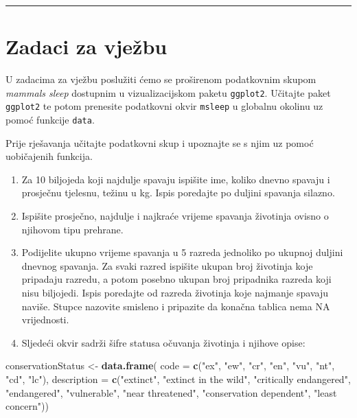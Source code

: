 \documentclass[]{book}
\newenvironment{Shaded}{\begin{snugshade}}{\end{snugshade}}
\newcommand{\KeywordTok}[1]{\textcolor[rgb]{0.13,0.29,0.53}{\textbf{#1}}}
\newcommand{\DataTypeTok}[1]{\textcolor[rgb]{0.13,0.29,0.53}{#1}}
\newcommand{\StringTok}[1]{\textcolor[rgb]{0.31,0.60,0.02}{#1}}
\newcommand{\NormalTok}[1]{#1}
\theoremstyle{definition}
\theoremstyle{definition}
\theoremstyle{definition}
\theoremstyle{remark}
\begin{document}
\begin{center}\rule{0.5\linewidth}{\linethickness}\end{center}

\section*{Zadaci za vježbu}\label{zadaci-za-vjezbu-9}

U zadacima za vježbu poslužiti ćemo se proširenom podatkovnim skupom
\emph{mammals sleep} dostupnim u vizualizacijskom paketu
\texttt{ggplot2}. Učitajte paket \texttt{ggplot2} te potom prenesite
podatkovni okvir \texttt{msleep} u globalnu okolinu uz pomoć funkcije
\texttt{data}.

Prije rješavanja učitajte podatkovni skup i upoznajte se s njim uz pomoć
uobičajenih funkcija.

\begin{enumerate}
\def\labelenumi{\arabic{enumi}.}
\item
  Za 10 biljojeda koji najdulje spavaju ispišite ime, koliko dnevno
  spavaju i prosječnu tjelesnu, težinu u kg. Ispis poredajte po duljini
  spavanja silazno.
\item
  Ispišite prosječno, najdulje i najkraće vrijeme spavanja životinja
  ovisno o njihovom tipu prehrane.
\item
  Podijelite ukupno vrijeme spavanja u 5 razreda jednoliko po ukupnoj
  duljini dnevnog spavanja. Za svaki razred ispišite ukupan broj
  životinja koje pripadaju razredu, a potom posebno ukupan broj
  pripadnika razreda koji nisu biljojedi. Ispis poredajte od razreda
  životinja koje najmanje spavaju naviše. Stupce nazovite smisleno i
  pripazite da konačna tablica nema NA vrijednosti.
\item
  Sljedeći okvir sadrži šifre statusa očuvanja životinja i njihove
  opise:
\end{enumerate}

\begin{Shaded}
\begin{Highlighting}[]
\NormalTok{conservationStatus <-}\StringTok{ }\KeywordTok{data.frame}\NormalTok{( }
  \DataTypeTok{code =} \KeywordTok{c}\NormalTok{(}\StringTok{"ex"}\NormalTok{, }\StringTok{"ew"}\NormalTok{, }\StringTok{"cr"}\NormalTok{, }\StringTok{"en"}\NormalTok{, }\StringTok{"vu"}\NormalTok{, }\StringTok{"nt"}\NormalTok{, }\StringTok{"cd"}\NormalTok{, }\StringTok{"lc"}\NormalTok{),}
  \DataTypeTok{description =} \KeywordTok{c}\NormalTok{(}\StringTok{"extinct"}\NormalTok{, }\StringTok{"extinct in the wild"}\NormalTok{, }
                 \StringTok{"critically endangered"}\NormalTok{, }\StringTok{"endangered"}\NormalTok{,}
                 \StringTok{"vulnerable"}\NormalTok{, }\StringTok{"near threatened"}\NormalTok{, }
                 \StringTok{"conservation dependent"}\NormalTok{, }\StringTok{"least concern"}\NormalTok{))}
\end{Highlighting}
\end{Shaded}
\end{document}
